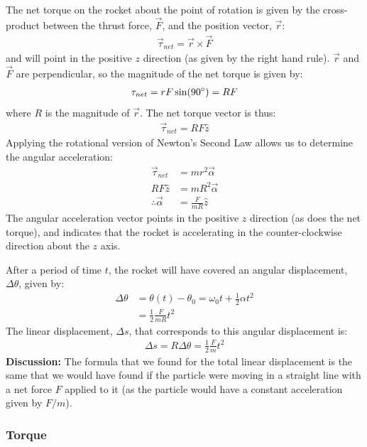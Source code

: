 \begin{framed}
\begin{framed}
The net torque on the rocket about the point of rotation is given by the cross-product between the thrust force, $\vec F$, and the position vector, $\vec r$:
\begin{align*}
\vec\tau_{net} = \vec r\times\vec F
\end{align*}
and will point in the positive $z$ direction (as given by the right hand rule). $\vec r$ and $\vec F$ are perpendicular, so the magnitude of the net torque is given by:
\begin{align*}
\tau_{net} = rF \sin(90{\degree}) = RF
\end{align*}
where $R$ is the magnitude of $\vec r$. The net torque vector is thus:
\begin{align*}
\vec\tau_{net} = RF \hat z
\end{align*}
Applying the rotational version of Newton's Second Law allows us to determine the angular acceleration:
\begin{align*}
\vec \tau _{net} &= mr^2\vec\alpha\\
RF \hat z&= mR^2\vec\alpha\\
\therefore \vec \alpha &= \frac{F}{mR}\hat z
\end{align*}
The angular acceleration vector points in the positive $z$ direction (as does the net torque), and indicates that the rocket is accelerating in the counter-clockwise direction about the $z$ axis.

After a period of time $t$, the rocket will have covered an angular displacement, $\Delta \theta$, given by:
\begin{align*}
\Delta \theta &= \theta(t)-\theta_0 = \omega_0t + \frac{1}{2}\alpha t^2\\
&=\frac{1}{2}\frac{F}{mR} t^2
\end{align*}
The linear displacement, $\Delta s$, that corresponds to this angular displacement is:
\begin{align*}
\Delta s = R \Delta\theta = \frac{1}{2}\frac{F}{m} t^2
\end{align*}
\textbf{Discussion:} The formula that we found for the total linear displacement is the same that we would have found if the particle were moving in a straight line with a net force $F$ applied to it (as the particle would have a constant acceleration given by $F/m$).
\end{framed}
\end{framed}

\subsubsection{Torque}\label{sec:rotationaldynamics:torque}

